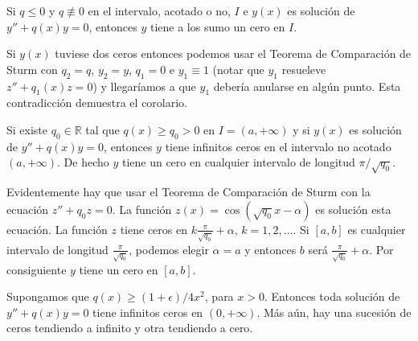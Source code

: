 \begin{corolario} Si $q\leq 0$ y $q\not\equiv 0$ en el intervalo, acotado o no, $I$ e  $y(x)$ es solución de $y''+q(x)y=0$, entonces $y$ tiene a los sumo un cero en $I$.
\end{corolario}
\begin{demo} Si $y(x)$ tuviese dos ceros entonces podemos usar el Teorema de Comparación de Sturm con $q_2=q$, $y_2=y$, $q_1=0$ e $y_1\equiv 1$ (notar que $y_1$ resueleve $z''+q_1(x)z=0$) y llegaríamos a que $y_1$ debería anularse en algún punto. Esta contradicción demuestra el corolario.  
\end{demo}



\begin{corolario} Si existe $q_0\in\mathbb{R}$ tal que  $q(x)\geq q_0>0$ en $I=(a,+\infty)$ y si  $y(x)$ es solución de $y''+q(x)y=0$, entonces $y$ tiene infinitos ceros en el intervalo no acotado $(a,+\infty)$. De hecho $y$ tiene un cero en cualquier intervalo de longitud $\pi/\sqrt{q_0}$.
\end{corolario}
\begin{demo}  Evidentemente hay que usar el Teorema de Comparación de Sturm con la ecuación $z''+q_0z=0$. La función  $z(x)=\cos(\sqrt{q_0}x-\alpha)$ es solución  esta ecuación. La función $z$ tiene ceros en  $k\frac{\pi}{\sqrt{q_0}}+\alpha$, $k=1,2,\ldots$. Si $[a,b]$ es cualquier intervalo de longitud $ \frac{\pi}{\sqrt{q_0}}$, podemos elegir $\alpha=a$ y entonces $b$ será $\frac{\pi}{\sqrt{q_0}}+\alpha$. Por consiguiente $y$ tiene un cero en $[a,b]$.
\end{demo}



\begin{corolario} Supongamos que $q(x)\geq (1+\epsilon)/4x^2$, para $x>0$. Entonces toda solución de 
$y''+q(x)y=0$ tiene infinitos ceros en $(0,+\infty)$. Más aún, hay una sucesión de ceros tendiendo a infinito y otra tendiendo a cero.
\end{corolario}

